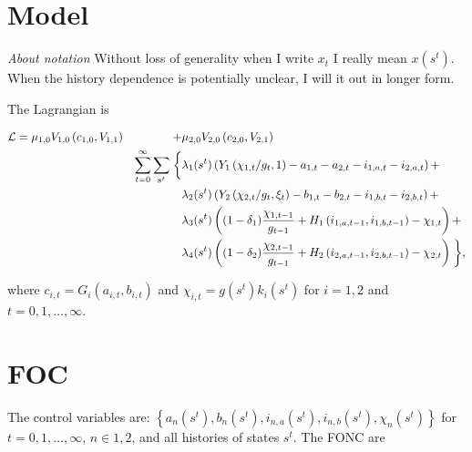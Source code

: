 \documentclass[19pt]{article}
\begin{document}
\section{Model}

\textit{About notation} Without loss of generality when I write $x_t$ I really mean $x(s^t)$. When the history dependence is potentially unclear, I will it out in longer form.

The Lagrangian is

\begin{alignat}{2} \label{eq:lagrangian}
  \mathcal{L} &= \mu_{1,0} V_{1,0}\left(c_{1,0}, V_{1,1}\right) &+& \mu_{2,0} V_{2,0}\left(c_{2,0}, V_{2,1} \right) \notag \\
  & & \sum_{t=0}^{\infty} \sum_{s^t}  \biggm \{
      &\lambda_{1}(s^t) \left( Y_1\left(\chi_{1,t}/g_t, 1\right) - a_{1,t} - a_{2,t} - i_{1,a,t} - i_{2,a,t} \right) + \notag \\
  & & &\lambda_{2}(s^t) \left( Y_2\left(\chi_{2,t}/g_t, \xi_t\right) - b_{1,t} - b_{2,t} - i_{1,b,t} - i_{2,b,t} \right) + \notag \\
  & & &\lambda_{3}(s^t) \left( (1-\delta_1)\frac{\chi_{1,t-1}}{g_{t-1}} + H_1 \left(i_{1,a,t-1}, i_{1,b,t-1} \right) - \chi_{1,t} \right) + \notag \\
  & & &\lambda_{4}(s^t) \left( (1-\delta_2)\frac{\chi_{2,t-1}}{g_{t-1}} + H_2 \left(i_{2,a,t-1}, i_{2,b,t-1} \right) - \chi_{2,t} \right)  \biggm\},
\end{alignat}

where $c_{i,t} = G_i(a_{i,t}, b_{i,t})$ and $\chi_{i,t} = g(s^t) k_i(s^t)$ for $i=1,2$ and $t=0, 1, \dots, \infty$.

\section{FOC}

The control variables are: $\left\{a_{n}(s^t), b_{n}(s^t), i_{n,a}(s^t), i_{n,b}(s^t), \chi_{n}(s^t) \right\}$ for $t=0,1,\dots, \infty$, $n \in {1,2}$, and all histories of states $s^t$. The FONC are
\end{document}
